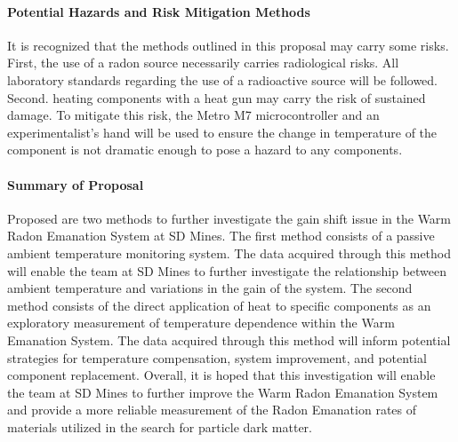 \documentclass[letterpaper,12pt]{article}
\begin{document}
\paragraph*{Potential Hazards and Risk Mitigation Methods}
It is recognized that the methods outlined in this proposal may carry some risks.
First, the use of a radon source necessarily carries radiological risks. 
All laboratory standards regarding the use of a radioactive source will be
followed.
Second. heating components with a heat gun may carry the risk of sustained damage.
To mitigate this risk, the Metro M7 microcontroller and an experimentalist's
hand will be used to ensure the change in temperature of the component is not 
dramatic enough to pose a hazard to any components.

\paragraph*{Summary of Proposal}
Proposed are two methods to further investigate the gain shift issue in the 
Warm Radon Emanation System at SD Mines.
The first method consists of a passive ambient temperature monitoring system.
The data acquired through this method will enable the team at SD Mines to further
investigate the relationship between ambient temperature and variations in the 
gain of the system.
The second method consists of the direct application of heat to specific components
as an exploratory measurement of temperature dependence within the Warm Emanation 
System.
The data acquired through this method will inform potential strategies for 
temperature compensation, system improvement, and potential component replacement.
Overall, it is hoped that this investigation will enable the team at SD Mines
to further improve the Warm Radon Emanation System and provide a more reliable 
measurement of the Radon Emanation rates of materials utilized in the search for
particle dark matter.
\end{document}
